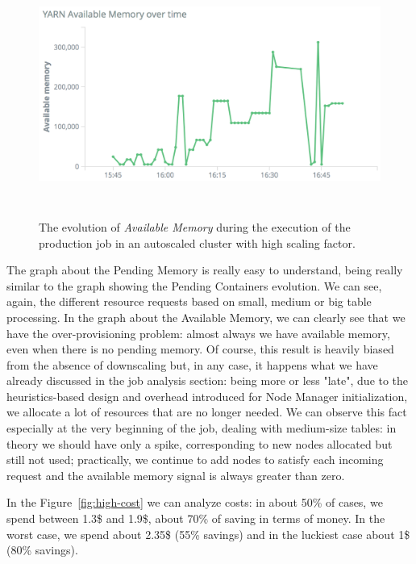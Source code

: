 \documentclass[12pt,twoside,cucitura]{toptesi}
\begin{document}
\begin{figure}
\centering
\includegraphics[height=80mm]{high-a-memory}
\caption{The evolution of \textit{Available Memory} during the execution of the production job in an autoscaled cluster with high scaling factor.}\label{fig:high-a-memory}
\end{figure}

The graph about the Pending Memory is really easy to understand, being really similar to the graph showing the Pending Containers evolution. We can see, again, the different resource requests based on small, medium or big table processing. In the graph about the Available Memory, we can clearly see that we have the over-provisioning problem: almost always we have available memory, even when there is no pending memory. Of course, this result is heavily biased from the absence of downscaling but, in any case, it happens what we have already discussed in the job analysis section: being more or less "late", due to the heuristics-based design and overhead introduced for Node Manager initialization, we allocate a lot of resources that are no longer needed. We can observe this fact especially at the very beginning of the job, dealing with medium-size tables: in theory we should have only a spike, corresponding to new nodes allocated but still not used; practically, we continue to add nodes to satisfy each incoming request and the available memory signal is always greater than zero.

In the Figure~\ref{fig:high-cost} we can analyze costs: in about 50\% of cases, we spend between 1.3\$ and 1.9\$, about 70\% of saving in terms of money. In the worst case, we spend about 2.35\$ (55\% savings) and in the luckiest case about 1\$ (80\% savings). 
\end{document}
